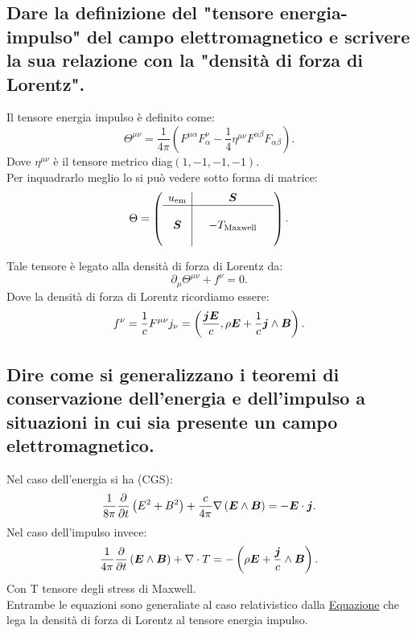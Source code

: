 \subsection[]{Dare la definizione del "tensore energia-impulso" del campo elettromagnetico e scrivere la sua relazione con la "densità di forza di Lorentz".}
\label{sec:3.b.9}
Il tensore energia impulso è definito come:
\[
	\Theta^{\mu\nu}=\frac{1}{4\pi}\left( F^{\mu\alpha}F^{\nu}_{\alpha}- \frac{1}{4}\eta^{\mu\nu}F^{\alpha\beta}F_{\alpha\beta} \right) 
.\] 
Dove $\eta^{\mu\nu}$ è il tensore metrico diag$\left( 1,-1,-1,-1 \right)$.\\
Per inquadrarlo meglio lo si può vedere sotto forma di matrice: 
\[
	 \Theta= 
	 \left(
		 \begin{array}{c|ccc}
			 u_{\text{em}} 	& 		&	\boldsymbol{S}  	&	\\   
		 	\hline	 
					&		&  			&	\\
		 	\boldsymbol{S} 		&  		&  	-T_{\text{Maxwell}}		& 	\\
		 	 		&  		&  			& 	\\
		 \end{array}
	 \right) 
.\] 

Tale tensore è legato alla densità di forza di Lorentz da:
\[
	\partial_{\mu}\Theta^{\mu\nu}+f^{\nu}=0
.\] 
Dove la densità di forza di Lorentz ricordiamo essere: \[
	f^{\nu}=\frac{1}{c}F^{\mu\nu}j_{\nu}=\left( \frac{\boldsymbol{j}\boldsymbol{E}}{c}, \rho \boldsymbol{E}+\frac{1}{c} \boldsymbol{j}\wedge \boldsymbol{B}  \right) 
.\] \label{eq:conservazioni-relativita} 
\subsection[]{Dire come si generalizzano i teoremi di conservazione dell'energia e dell'impulso a situazioni in cui sia presente un campo elettromagnetico.}
\label{sec:3.b.10}
Nel caso dell'energia si ha (CGS):
\[
	\frac{1}{8\pi}\frac{\partial }{\partial t} \left( E^2+B^2 \right) + \frac{c}{4\pi}\nabla\left( \boldsymbol{E}\wedge \boldsymbol{B} \right) = - \boldsymbol{E}\cdot \boldsymbol{j}
.\] 
Nel caso dell'impulso invece: \[
	\frac{1}{4\pi}\frac{\partial}{\partial t}\left(\boldsymbol{E}\wedge\boldsymbol{B}\right)+\nabla\cdot T=-\left(\rho\boldsymbol{E}+\frac{\boldsymbol{j}}{c}\wedge \boldsymbol{B}\right) 
.\]
Con T tensore degli stress di Maxwell.\\
Entrambe le equazioni sono generaliate al caso relativistico dalla \hyperref[eq:conservazioni-relativita]{Equazione} che lega la densità di forza di Lorentz al tensore energia impulso.

